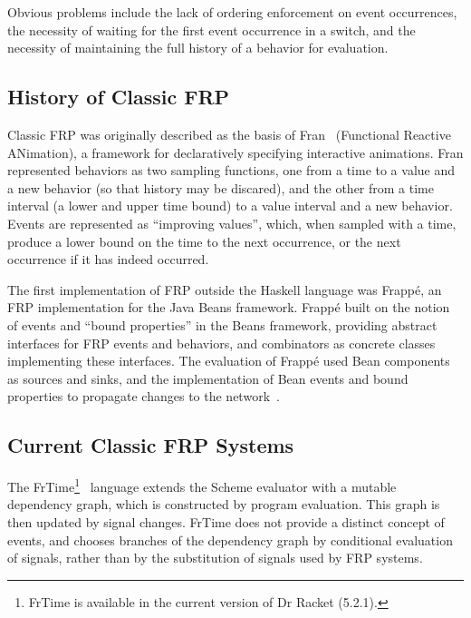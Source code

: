 Obvious problems include the lack of ordering enforcement on event occurrences,
the necessity of waiting for the first event occurrence in a switch, and the
necessity of maintaining the full history of a behavior for evaluation.

\subsection{History of Classic FRP}
\label{subsection:Background-Classic_FRP-History_of_Classic_FRP}
Classic FRP was originally described as the basis of Fran~\cite{Elliott1997}
(Functional Reactive ANimation), a framework for declaratively specifying
interactive animations. Fran represented behaviors as two sampling functions,
one from a time to a value and a new behavior (so that history may be discared),
and the other from a time interval (a lower and upper time bound) to a value
interval and a new behavior. Events are represented as ``improving values'',
which, when sampled with a time, produce a lower bound on the time to the next
occurrence, or the next occurrence if it has indeed occurred.

The first implementation of FRP outside the Haskell language was Frapp\'{e}, an
FRP implementation for the Java Beans framework. Frapp\'{e} built on the notion
of events and ``bound properties'' in the Beans framework, providing abstract
interfaces for FRP events and behaviors, and combinators as concrete classes
implementing these interfaces. The evaluation of Frapp\'{e} used Bean components
as sources and sinks, and the implementation of Bean events and bound properties
to propagate changes to the network~\cite{Courtney2001-2}. 

\subsection{Current Classic FRP Systems}
\label{subsection:Background-Classic_FRP-Current_Classic_FRP_Systems}

The FrTime\footnote{FrTime is available in the current version of Dr Racket (5.2.1).}~\cite{Cooper2006}
language extends the Scheme evaluator with a mutable dependency graph, which is
constructed by program evaluation. This graph is then updated by signal changes.
FrTime does not provide a distinct concept of events, and chooses branches of
the dependency graph by conditional evaluation of signals, rather than by the
substitution of signals used by FRP systems.


